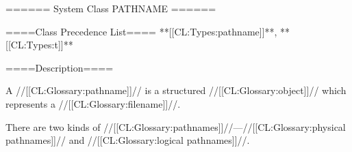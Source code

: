 ====== System Class PATHNAME ======

====Class Precedence List==== **[[CL:Types:pathname]]**, **[[CL:Types:t]]**

====Description====

A //[[CL:Glossary:pathname]]// is a structured //[[CL:Glossary:object]]// which represents a //[[CL:Glossary:filename]]//.

There are two kinds of //[[CL:Glossary:pathnames]]//---//[[CL:Glossary:physical pathnames]]// and //[[CL:Glossary:logical pathnames]]//.

